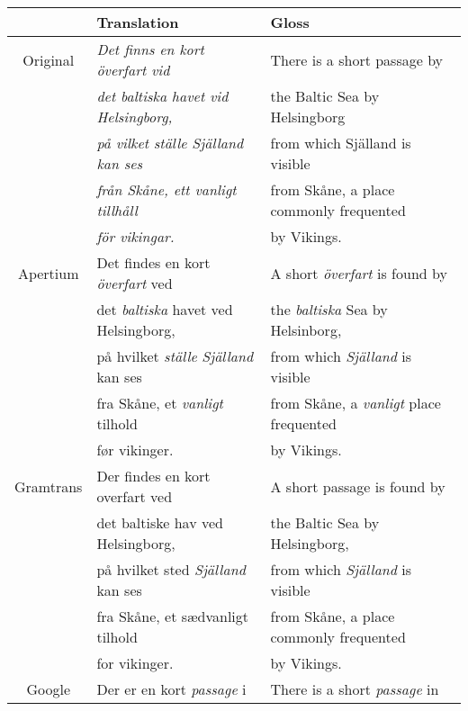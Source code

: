 \documentclass[11pt]{article}
\begin{document}
\begin{table*}
 \begin{tabular}{|c|l|l|}
\hline
           & Translation                                & Gloss \\
\hline
Original   & \emph{Det finns en kort överfart vid}      & There is a short passage by \\
~          & \emph{det baltiska havet vid Helsingborg,} & the Baltic Sea by Helsingborg  \\
~          & \emph{på vilket ställe Själland kan ses }  & from which Själland is visible \\ 
~          & \emph{från Skåne, ett vanligt tillhåll }   & from Skåne, a place commonly frequented \\ 
~          & \emph{för vikingar.}                       & by Vikings.\\
\hline
Apertium   & Det findes en kort \emph{överfart} ved           & A short \emph{överfart} is found by \\
~          & det \emph{baltiska} havet ved Helsingborg,       & the \emph{baltiska} Sea by Helsinborg, \\
~          & på hvilket \emph{ställe} \emph{Själland} kan ses & from which \emph{Själland} is visible \\
~          & fra Skåne, et \emph{vanligt} tilhold             & from Skåne, a \emph{vanligt} place frequented \\
~          & før vikinger.                                    & by Vikings.\\               
\hline
Gramtrans  & Der findes en kort overfart ved                  & A short passage is found by \\
~          & det baltiske hav ved Helsingborg,                & the Baltic Sea by Helsingborg, \\
~          & på hvilket sted \emph{Själland} kan ses          & from which \emph{Själland} is visible \\
~          & fra Skåne, et sædvanligt tilhold                 & from Skåne, a place commonly frequented \\
~          & for vikinger.                                    & by Vikings. \\
\hline
Google     & Der er en kort \emph{passage} i                  & There is a short \emph{passage} in \\

\end{tabular}
\end{table*}
\end{document}

